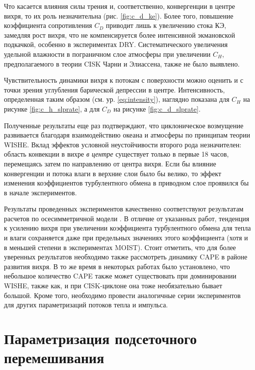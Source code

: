 Что касается влияния силы трения и, соответственно, конвергенции в центре вихря, то их роль незначительна (рис. \ref{fig:c_d_ke}). Более того, повышение коэффициента сопротивления $C_D$ приводит лишь к увеличению стока КЭ, замедляя рост вихря, что не компенсируется более интенсивной экмановской подкачкой, особенно в экспериментах DRY. Систематического увеличения удельной влажности в пограничном слое атмосферы при увеличении $C_H$, предполагаемого в теории CISK Чарни и Элиассена, также не было выявлено.

Чувствительность динамики вихря к потокам с поверхности можно оценить и с точки зрения углубления барической депрессии в центре. Интенсивность, определенная таким образом (см. ур. \eqref{eq:intensity}), наглядно показана для $C_H$  на рисунке \ref{fig:c_h_slprate}, а для $C_D$  на рисунке \ref{fig:c_d_slprate}.

Полученные результаты еще раз подтверждают, что циклоническое возмущение развивается благодаря взаимодействию океана и атмосферы по принципам теории WISHE. Вклад эффектов условной неустойчивости второго рода незначителен: область конвекции в вихре \emph{в центре} существует только в первые 18 часов, перемещаясь затем по направлению от центра вихря. Если бы влияние конвергенции и потока влаги в верхние слои было бы велико, то эффект изменения коэффициентов турбулентного обмена в приводном слое проявился бы в начале экспериментов.

Результаты проведенных экспериментов качественно соответствуют результатам расчетов по осесимметричной модели \citep{CraigGray1996, EmanuelRotunno1989}. В отличие от указанных работ, тенденция к усилению вихря при увеличении коэффициента турбулентного обмена для тепла и влаги сохраняется даже при предельных значениях этого коэффициента (хотя и в меньшей степени в экспериментах MOIST). Стоит отметить, что для более уверенных результатов необходимо также рассмотреть динамику CAPE в районе развития вихря. В то же время в некоторых работах было установлено, что небольшое количество CAPE также может существовать при доминировании WISHE, также как, и при CISK-циклоне она тоже необязательно бывает большой. Кроме того, необходимо провести аналогичные серии экспериментов для других параметризаций потоков тепла и импульса.

\section{Параметризация подсеточного перемешивания}
\label{sec:res:closure}

